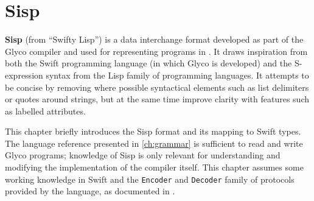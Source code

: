 \documentclass[main.tex]{subfiles}
\begin{document}
\onlyinsubfile{\mainmatter{}\appendix{}}

\chapter{Sisp} \label{ch:sisp}
\textbf{Sisp} (from \enquote{Swifty Lisp}) is a data interchange format developed as part of the Glyco compiler and used for representing programs in . It draws inspiration from both the Swift programming language (in which Glyco is developed) and the S-expression syntax from the Lisp family of programming languages. It attempts to be concise by removing where possible syntactical elements such as list delimiters or quotes around strings, but at the same time improve clarity with features such as labelled attributes.

This chapter briefly introduces the Sisp format and its mapping to Swift types. The language reference presented in \cref{ch:grammar} is sufficient to read and write Glyco programs; knowledge of Sisp is only relevant for understanding and modifying the implementation of the compiler itself. This chapter assumes some working knowledge in Swift and the \texttt{Encoder} and \texttt{Decoder} family of protocols provided by the language, as documented in \cite{swiftcoding}.
\end{document}
